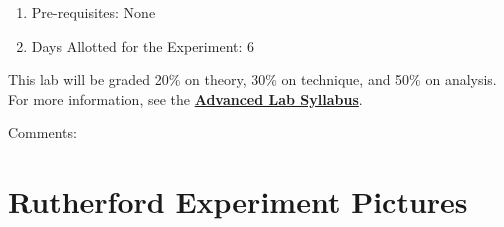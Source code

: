 \documentclass{../lab}
\begin{document}
\begin{enumerate}
    \item Pre-requisites: None

    \item Days Allotted for the Experiment: 6
\end{enumerate}

This lab will be graded 20\% on theory, 30\% on technique, and 50\% on analysis. For more information, see the \href{\AdvancedLabSyllabus}{\textbf{Advanced Lab Syllabus}}.

Comments: \Feedback

\section{Rutherford Experiment Pictures}
\end{document}
